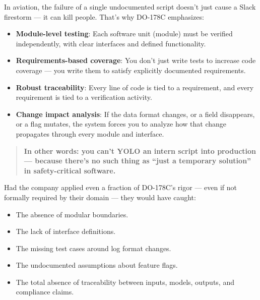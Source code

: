     \medskip
    
    In aviation, the failure of a single undocumented script doesn’t just cause a Slack firestorm — it can kill people.  
    That’s why DO-178C emphasizes:
    
    \begin{itemize}
        \item \textbf{Module-level testing}: Each software unit (module) must be verified independently, with clear interfaces and defined functionality.
        \item \textbf{Requirements-based coverage}: You don’t just write tests to increase code coverage — you write them to satisfy explicitly documented requirements.
        \item \textbf{Robust traceability}: Every line of code is tied to a requirement, and every requirement is tied to a verification activity.
        \item \textbf{Change impact analysis}: If the data format changes, or a field disappears, or a flag mutates, the system forces you to analyze how that change propagates through every module and interface.
    \end{itemize}
    
    \medskip
    
    \begin{quote}
    \textbf{In other words: you can’t YOLO an intern script into production — because there’s no such thing as “just a temporary solution” in safety-critical software.}
    \end{quote}
    
    \medskip
    
    Had the company applied even a fraction of DO-178C’s rigor — even if not formally required by their domain — they would have caught:
    
    \begin{itemize}
        \item The absence of modular boundaries.
        \item The lack of interface definitions.
        \item The missing test cases around log format changes.
        \item The undocumented assumptions about feature flags.
        \item The total absence of traceability between inputs, models, outputs, and compliance claims.
    \end{itemize}
    
    \medskip
    
